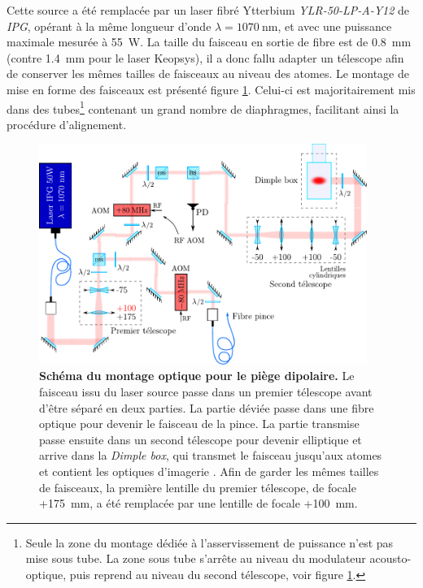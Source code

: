 Cette source a été remplacée par un laser fibré Ytterbium \emph{YLR-50-LP-A-Y12} de \emph{IPG}, opérant à la même longueur d'onde $\lambda=\SI{1070}{\nano\metre}$, et avec une puissance maximale mesurée à \SI{55}{\watt}. La taille du faisceau en sortie de fibre est de \SI{0.8}{\milli\metre} (contre \SI{1.4}{\milli\metre} pour le laser Keopsys), il a donc fallu adapter un télescope afin de conserver les mêmes tailles de faisceaux au niveau des atomes. Le montage de mise en forme des faisceaux est présenté figure \ref{fig:optique_1070}. Celui-ci est majoritairement mis dans des tubes\footnote{Seule la zone du montage dédiée à l'asservissement de puissance n'est pas mise sous tube. La zone sous tube s'arrête au niveau du modulateur acousto-optique, puis reprend au niveau du second télescope, voir figure \ref{fig:optique_1070}.} contenant un grand nombre de diaphragmes, facilitant ainsi la procédure d'alignement.

\begin{figure}
\centering
\includegraphics[width=0.95\textwidth]{Fig/Modif_exp/optique_1070_new_style.pdf}
\caption{\textbf{Schéma du montage optique pour le piège dipolaire.} Le faisceau issu du laser source passe dans un premier télescope avant d'être séparé en deux parties. La partie déviée passe dans une fibre optique pour devenir le faisceau de la pince. La partie transmise passe ensuite dans un second télescope pour devenir elliptique et arrive dans la \emph{Dimple box}, qui transmet le faisceau jusqu'aux atomes et contient les optiques d'imagerie \citep{muller2015coherent}. Afin de garder les mêmes tailles de faisceaux, la première lentille du premier télescope, de focale +\SI{175}{\milli\metre}, a été remplacée par une lentille de focale +\SI{100}{\milli\metre}.}
\label{fig:optique_1070}
\end{figure}

